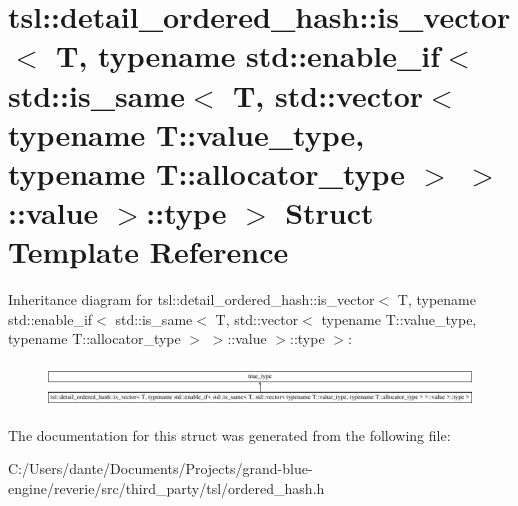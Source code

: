 \hypertarget{structtsl_1_1detail__ordered__hash_1_1is__vector_3_01_t_00_01typename_01std_1_1enable__if_3_01stf66c13d2e1a3de07d811d8d981a2b62f}{}\section{tsl\+::detail\+\_\+ordered\+\_\+hash\+::is\+\_\+vector$<$ T, typename std\+::enable\+\_\+if$<$ std\+::is\+\_\+same$<$ T, std\+::vector$<$ typename T\+::value\+\_\+type, typename T\+::allocator\+\_\+type $>$ $>$\+::value $>$\+::type $>$ Struct Template Reference}
\label{structtsl_1_1detail__ordered__hash_1_1is__vector_3_01_t_00_01typename_01std_1_1enable__if_3_01stf66c13d2e1a3de07d811d8d981a2b62f}
Inheritance diagram for tsl\+::detail\+\_\+ordered\+\_\+hash\+::is\+\_\+vector$<$ T, typename std\+::enable\+\_\+if$<$ std\+::is\+\_\+same$<$ T, std\+::vector$<$ typename T\+::value\+\_\+type, typename T\+::allocator\+\_\+type $>$ $>$\+::value $>$\+::type $>$\+:\begin{figure}[H]
\begin{center}
\leavevmode
\includegraphics[height=1.166667cm]{structtsl_1_1detail__ordered__hash_1_1is__vector_3_01_t_00_01typename_01std_1_1enable__if_3_01stf66c13d2e1a3de07d811d8d981a2b62f}
\end{center}
\end{figure}


The documentation for this struct was generated from the following file\+:\begin{DoxyCompactItemize}
\item 
C\+:/\+Users/dante/\+Documents/\+Projects/grand-\/blue-\/engine/reverie/src/third\+\_\+party/tsl/ordered\+\_\+hash.\+h\end{DoxyCompactItemize}
